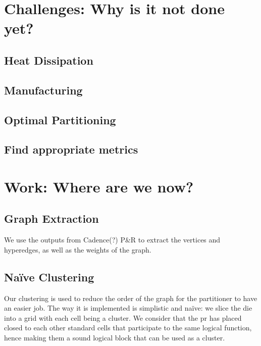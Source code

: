 \documentclass[11pt,a4paper]{article}
\theoremstyle{customdef}
\begin{document}
\section{Challenges: Why is it not done yet?}
\subsection{Heat Dissipation}
\subsection{Manufacturing}

\subsection{Optimal Partitioning}

\subsection{Find appropriate metrics}





\section{Work: Where are we now?}

\subsection{Graph Extraction}
We use the outputs from Cadence(?) P\&R to extract the vertices and hyperedges, as well as the weights of the graph.

\subsection{Naïve Clustering}
Our clustering is used to reduce the order of the graph for the partitioner to have an easier job.
The way it is implemented is simplistic and naïve: we slice the die into a grid with each cell being a cluster.
We consider that the \gls{pr} has placed closed to each other standard cells that participate to the same logical function, hence making them a sound logical block that can be used as a cluster.
\end{document}
